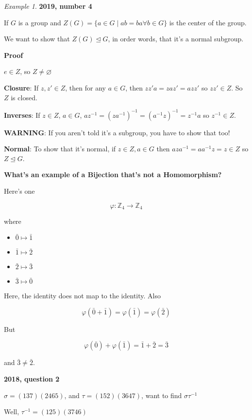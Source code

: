 \documentclass[12pt]{article}
\def\Z{{\mathbb Z}}
\theoremstyle{remark}
\theoremstyle{remark}
\theoremstyle{remark}
\newtheorem{example}{Example}
\theoremstyle{remark}
\theoremstyle{remark}
\begin{document}
\begin{example}
  {\bf 2019, number 4}

  If $G$ is a group and $Z(G) = \{a \in G \mid ab = ba \forall b \in G \}$ is
  the center of the group.

  We want to show that $Z(G) \trianglelefteq G$, in order words, that it's a
  normal subgroup.

  {\bf Proof}

  $e \in Z$, so $Z \ne \varnothing$

  {\bf Closure}: If $z, z' \in Z$, then for any $a \in G$, then $zz'a = zaz' =
  azz'$ so $zz' \in Z$. So $Z$ is closed.

  {\bf Inverses}: If $z \in Z$, $a \in G$, $az^{-1} = (za^{-1})^{-1} =
  (a^{-1}z)^{-1} = z^{-1}a$ so $z^{-1} \in Z$.

  {\bf WARNING}: If you aren't told it's a subgroup, you have to show that too!

  {\bf Normal}: To show that it's normal, if $z \in Z, a \in G$ then $aza^{-1} =
  aa^{-1}z = z \in Z$ so $Z \trianglelefteq G$.
\end{example}

{\bf What's an example of a Bijection that's not a Homomorphism?}

Here's one

\[
  \varphi: \Z_4 \to \Z_4
\]

where

\begin{itemize}
  \item $\bar 0 \mapsto \bar 1$
  \item $\bar 1 \mapsto \bar 2$
  \item $\bar 2 \mapsto \bar 3$
  \item $\bar 3 \mapsto \bar 0$
\end{itemize}

Here, the identity does not map to the identity. Also

\[
  \varphi(\bar 0 + \bar 1) = \varphi (\bar 1) = \varphi(\bar 2)
\]

But

\[
  \varphi(\bar 0) + \varphi(\bar 1) = \bar 1 + \bar 2 = \bar 3
\]

and $\bar 3 \ne \bar 2$.

{\bf 2018, question 2}

$\sigma = (137)(2465)$, and $\tau = (152)(3647)$, want to find $\sigma \tau^{-1}$

Well, $\tau^{-1} = (125)(3746)$
\end{document}
